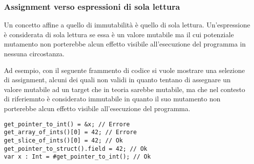 \subsubsection{Assignment verso espressioni di sola lettura}
Un concetto affine a quello di immutabilità è quello di sola lettura. Un'espressione è 
considerata di sola lettura se essa è un valore mutabile ma il cui potenziale mutamento 
non porterebbe alcun effetto visibile all'esecuzione del programma in nessuna circostanza.

Ad esempio, con il seguente frammento di codice si vuole mostrare una selezione di assignment, 
alcuni dei quali non validi in quanto tentano di assegnare un valore mutabile ad un target che 
in teoria sarebbe mutabile, ma che nel contesto di riferiemnto è considerato immutabile in quanto 
il suo mutamento non porterebbe alcun effetto visibile all'esecuzione del programma. \\

\begin{lstlisting}[frame=single]
get_pointer_to_int() = &x; // Errore
get_array_of_ints()[0] = 42; // Errore
get_slice_of_ints()[0] = 42; // Ok
get_pointer_to_struct().field = 42; // Ok
var x : Int = #get_pointer_to_int(); // Ok
\end{lstlisting}
\vspace{0.5cm}